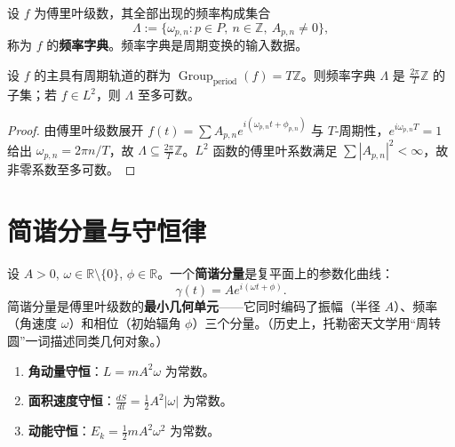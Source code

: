 \begin{definition}[频率字典]\label{def:frequency_dictionary}
设 $f$ 为傅里叶级数，其全部出现的频率构成集合
\[
\Lambda := \{\omega_{p,n} : p\in P,\ n\in\mathbb{Z},\ A_{p,n}\neq 0\},
\]
称为 $f$ 的\textbf{频率字典}。频率字典是周期变换的输入数据。
\end{definition}

\begin{property}[频率字典的结构]\label{prop:frequency_dictionary_structure}
设 $f$ 的主具有周期轨道的群为 $\operatorname{Group}_{\mathrm{period}}(f)=T\mathbb{Z}$。则频率字典 $\Lambda$ 是 $\frac{2\pi}{T}\mathbb{Z}$ 的子集；若 $f\in L^2$，则 $\Lambda$ 至多可数。
\end{property}

\begin{proof}
由傅里叶级数展开 $f(t)=\sum A_{p,n}e^{i(\omega_{p,n}t+\phi_{p,n})}$ 与 $T$-周期性，$e^{i\omega_{p,n}T}=1$ 给出 $\omega_{p,n}=2\pi n/T$，故 $\Lambda\subseteq\frac{2\pi}{T}\mathbb{Z}$。$L^2$ 函数的傅里叶系数满足 $\sum|A_{p,n}|^2<\infty$，故非零系数至多可数。
\end{proof}

\section{简谐分量与守恒律}

\begin{definition}[简谐分量]\label{def:harmonic_component}
设 $A > 0$, $\omega \in \mathbb{R}\setminus\{0\}$, $\phi \in \mathbb{R}$。一个\textbf{简谐分量}是复平面上的参数化曲线：
\[
\gamma(t) = A e^{i(\omega t + \phi)}.
\]
简谐分量是傅里叶级数的\textbf{最小几何单元}——它同时编码了振幅（半径 $A$）、频率（角速度 $\omega$）和相位（初始辐角 $\phi$）三个分量。（历史上，托勒密天文学用“周转圆”一词描述同类几何对象。）
\end{definition}

\begin{theorem}[简谐分量的三大守恒量]\label{thm:harmonic_three_conservations}
\begin{enumerate}[label=(\roman*)]
    \item \textbf{角动量守恒}：$L = m A^2 \omega$ 为常数。
    \item \textbf{面积速度守恒}：$\frac{dS}{dt} = \frac{1}{2}A^2|\omega|$ 为常数。
    \item \textbf{动能守恒}：$E_k = \frac{1}{2}m A^2 \omega^2$ 为常数。
\end{enumerate}
\end{theorem}

